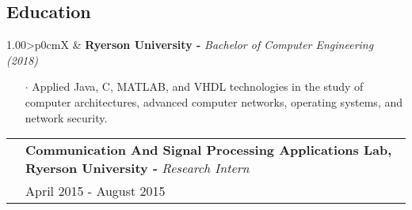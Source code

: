 \documentclass[a4paper, oneside, final]{scrartcl} %
\newcommand{\gray}{\rowcolor[gray]{.90}} %
\begin{document}
\begin{center}
  \section{Education}
  \begin{flushleft}
  \begin{tabularx}{1.00\linewidth}{>{\raggedleft\scshape}p{0cm}X}
    \gray& \textbf{Ryerson University -} \textit{Bachelor of Computer Engineering (2018)}\\
  \end{tabularx}
  \begin{itemize}\itemsep-0.2cm
      \vspace{-0.1cm}
        \item[$\cdot$] Applied Java, C, MATLAB, and VHDL technologies in the study of computer architectures, advanced computer networks, operating systems, and network security. \\
  \end{itemize}
  \end{flushleft}
  \vspace{-0.2cm}
  \begin{tabularx}{1.00\linewidth}{>{\raggedleft\scshape}p{0cm}X}
    \gray& \textbf{Communication And Signal Processing Applications Lab, Ryerson University -} \textit{Research Intern}\\
    \gray& {April 2015 - August 2015}\\
  \end{tabularx}
  \vspace{-0.2cm}
  \begin{itemize}\itemsep-0.2cm
      \vspace{-0.1cm}


\end{itemize}
\end{center}
\end{document}
